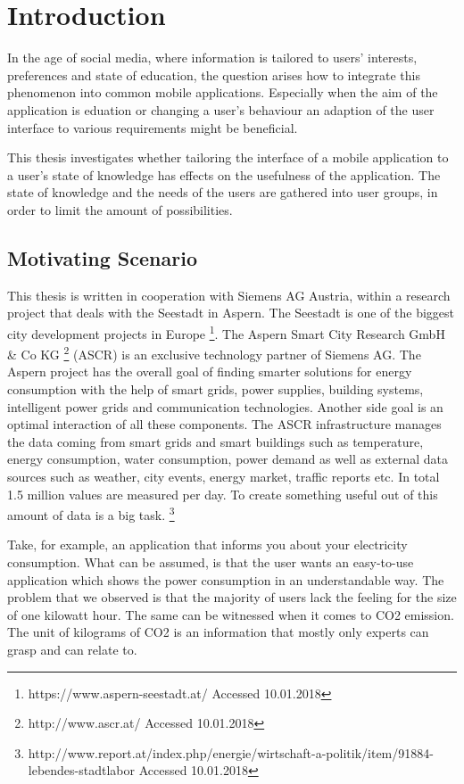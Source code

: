\chapter{Introduction}

In the age of social media, where information is tailored to users' interests, preferences and state of education, the question arises how to integrate this phenomenon into common mobile applications. Especially when the aim of the application is eduation or changing a user's behaviour an adaption of the user interface to various requirements might be beneficial.

This thesis investigates whether tailoring the interface of a mobile application to a user's state of knowledge has effects on the usefulness of the application. The state of knowledge and the needs of the users are gathered into user groups, in order to limit the amount of possibilities.


\section{Motivating Scenario}

This thesis is written in cooperation with Siemens AG Austria, within a research project that deals with the Seestadt in Aspern. The Seestadt is one of the biggest city development projects in Europe \footnote{https://www.aspern-seestadt.at/ Accessed 10.01.2018}. The Aspern Smart City Research GmbH \& Co KG \footnote{http://www.ascr.at/ Accessed 10.01.2018} (ASCR) is an exclusive technology partner of Siemens AG. The Aspern project has the overall goal of finding smarter solutions for energy consumption with the help of smart grids, power supplies, building systems, intelligent power grids and communication technologies. Another side goal is an optimal interaction of all these components. The ASCR infrastructure manages the data coming from smart grids and smart buildings such as temperature, energy consumption, water consumption, power demand as well as external data sources such as weather, city events, energy market, traffic reports etc. \cite{parreira2015role} In total 1.5 million values are measured per day. To create something useful out of this amount of data is a big task. \footnote{http://www.report.at/index.php/energie/wirtschaft-a-politik/item/91884-lebendes-stadtlabor Accessed 10.01.2018}

Take, for example, an application that informs you about your electricity consumption. What can be assumed, is that the user wants an easy-to-use application which shows the power consumption in an understandable way. The problem that we observed is that the majority of users lack the feeling for the size of one kilowatt hour. The same can be witnessed when it comes to CO2 emission. The unit of kilograms of CO2 is an information that mostly only experts can grasp and can relate to.

